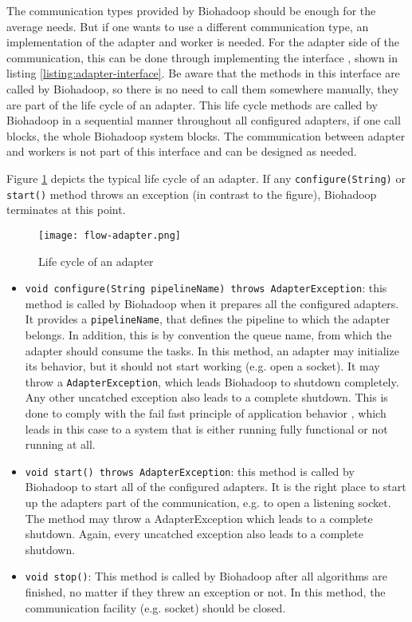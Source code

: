   The communication types provided by Biohadoop should be enough for the average needs. But if one wants to use a different communication type, an implementation of the adapter and worker is needed. For the adapter side of the communication, this can be done through implementing the interface , shown in listing \ref{listing:adapter-interface}. Be aware that the methods in this interface are called by Biohadoop, so there is no need to call them somewhere manually, they are part of the life cycle of an adapter. This life cycle methods are called by Biohadoop in a sequential manner throughout all configured adapters, if one call blocks, the whole Biohadoop system blocks. The communication between adapter and workers is not part of this interface and can be designed as needed.
  
  Figure \ref{fig:flow-adapter} depicts the typical life cycle of an adapter. If any \texttt{configure(String)} or \texttt{start()} method throws an exception (in contrast to the figure), Biohadoop terminates at this point.
  
  \begin{figure}[ht!]
    \centering
    \texttt{[image: flow-adapter.png]}
    \caption{Life cycle of an adapter}
    \label{fig:flow-adapter}
  \end{figure}
  
  

  \begin{itemize}
    \item \texttt{void configure(String pipelineName) throws AdapterException}: this method is called by Biohadoop when it prepares all the configured adapters. It provides a \texttt{pipelineName}, that defines the pipeline to which the adapter belongs. In addition, this is by convention the queue name, from which the adapter should consume the tasks. In this method, an adapter may initialize its behavior, but it should not start working (e.g. open a socket). It may throw a \texttt{AdapterException}, which leads Biohadoop to shutdown completely. Any other uncatched exception also leads to a complete shutdown. This is done to comply with the fail fast principle of application behavior \cite{shore2004fail}, which leads in this case to a system that is either running fully functional or not running at all.
    \item \texttt{void start() throws AdapterException}: this method is called by Biohadoop to start all of the configured adapters. It is the right place to start up the adapters part of the communication, e.g. to open a listening socket. The method may throw a AdapterException which leads to a complete shutdown. Again, every uncatched exception also leads to a complete shutdown.
    \item \texttt{void stop()}: This method is called by Biohadoop after all algorithms are finished, no matter if they threw an exception or not. In this method, the communication facility (e.g. socket) should be closed.
  \end{itemize}
  
